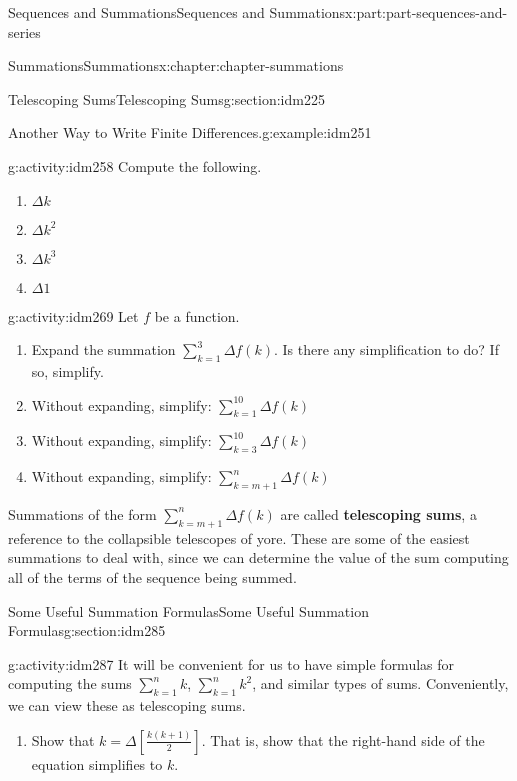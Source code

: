 \documentclass[oneside,10pt,]{book}
\newcommand{\terminology}[1]{\textbf{#1}}
\begin{document}
\begin{partptx}{Sequences and Summations}{}{Sequences and Summations}{}{}{x:part:part-sequences-and-series}
\begin{chapterptx}{Summations}{}{Summations}{}{}{x:chapter:chapter-summations}
\begin{sectionptx}{Telescoping Sums}{}{Telescoping Sums}{}{}{g:section:idm225}
\begin{example}{Another Way to Write Finite Differences.}{g:example:idm251}
\end{example}
\begin{activity}{}{g:activity:idm258}%
Compute the following.%
\begin{enumerate}[font=\bfseries,label=(\alph*),ref=\alph*]
\item{}\(\Delta k\)\item{}\(\Delta k^2\)\item{}\(\Delta k^3\)\item{}\(\Delta 1\)\end{enumerate}
\end{activity}
\begin{activity}{}{g:activity:idm269}%
Let \(f\) be a function.%
\begin{enumerate}[font=\bfseries,label=(\alph*),ref=\alph*]
\item{}Expand the summation \(\displaystyle\sum_{k = 1}^3 \Delta f(k)\). Is there any simplification to do? If so, simplify.%
\item{}Without expanding, simplify: \(\displaystyle\sum_{k = 1}^{10} \Delta f(k)\)\item{}Without expanding, simplify: \(\displaystyle\sum_{k = 3}^{10} \Delta f(k)\)\item{}Without expanding, simplify: \(\displaystyle\sum_{k = m+1}^{n} \Delta f(k)\)\end{enumerate}
\end{activity}
Summations of the form \(\displaystyle\sum_{k = m+1}^n \Delta f(k)\) are called \terminology{telescoping sums}, a reference to the collapsible telescopes of yore. These are some of the easiest summations to deal with, since we can determine the value of the sum computing all of the terms of the sequence being summed.%
\end{sectionptx}
%
%
\typeout{************************************************}
\typeout{************************************************}
%
\begin{sectionptx}{Some Useful Summation Formulas}{}{Some Useful Summation Formulas}{}{}{g:section:idm285}
\begin{activity}{}{g:activity:idm287}%
It will be convenient for us to have simple formulas for computing the sums \(\displaystyle\sum_{k=1}^n k\), \(\displaystyle\sum_{k=1}^n k^2\), and similar types of sums. Conveniently, we can view these as telescoping sums.%
\begin{enumerate}[font=\bfseries,label=(\alph*),ref=\alph*]
\item{}Show that \(k = \Delta \left[\frac{k(k+1)}{2}\right]\). That is, show that the right-hand side of the equation simplifies to \(k\).%

\end{enumerate}
\end{activity}
\end{sectionptx}
\end{chapterptx}
\end{partptx}
\end{document}
